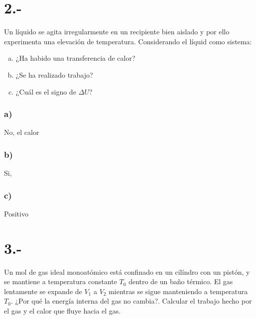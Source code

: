 \documentclass{article}
\begin{document}
\section*{2.-}
Un líquido se agita irregularmente en un recipiente bien aislado y por ello experimenta 
una elevación de temperatura. Considerando el líquid como sistema:
\begin{enumerate}[a)]
    \item ¿Ha habido una transferencia de calor? 
    \item ¿Se ha realizado trabajo?
    \item ¿Cuál es el signo de $\Delta U$?
\end{enumerate}
\begin{tcolorbox}[breakable]
    \subsubsection*{a)}
    No, el calor 
    \subsubsection*{b)}
    Si, 
    \subsubsection*{c)}
    Positivo
\end{tcolorbox}

\section*{3.-} 
Un mol de gas ideal monoatómico está confinado en un cilíndro con un pistón, y se mantiene 
a temperatura constante $T_0$ dentro de un baño térmico. El gas lentamente se expande de
$V_1$ a $V_2$ mientras se sigue manteniendo a temperatura $T_0$. ¿Por qué la energía interna 
del gas no cambia?. Calcular el trabajo hecho por el gas y el calor que fluye hacia el gas.
\begin{tcolorbox}[breakable]
    
\end{tcolorbox}
\end{document}

